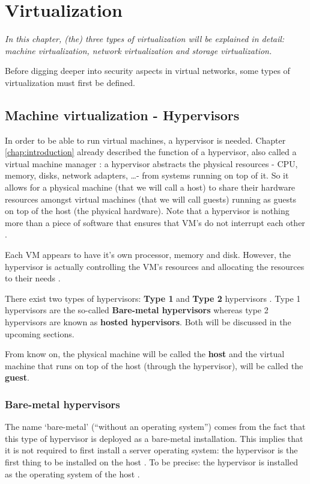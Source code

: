 \chapter{Virtualization}
\label{chap:virtualnetworks}
\emph{In this chapter, (the) three types of virtualization will be explained in detail: machine virtualization, network virtualization and storage virtualization.}

Before digging deeper into security aspects in virtual networks, some types of virtualization must first be defined.
\section{Machine virtualization - Hypervisors}
In order to be able to run virtual machines, a hypervisor is needed. Chapter \ref{chap:introduction} already described the function of a hypervisor, also called a virtual machine manager \citep{Techtarget}: a hypervisor abstracts the physical resources - CPU, memory, disks, network adapters, \ldots - from systems running on top of it. So it allows for a physical machine (that we will call a host) to share their hardware resources amongst virtual machines (that we will call guests) running as guests on top of the host (the physical hardware). Note that a hypervisor is nothing more than a piece of software \citep{Datacenter} that ensures that VM's do not interrupt each other \citep{Techtarget}.

Each VM appears to have it's own processor, memory and disk. However, the hypervisor is actually controlling the VM's resources and allocating the resources to their needs \citep{Techtarget}. 

There exist two types of hypervisors:  \textbf{Type 1} and \textbf{Type 2} hypervisors \citep{Techtarget2}. Type 1 hypervisors are the so-called \textbf{Bare-metal hypervisors} whereas type 2 hypervisors are known as \textbf{hosted hypervisors}. Both will be discussed in the upcoming sections.

From know on, the physical machine will be called the \textbf{host} and the virtual machine that runs on top of the host (through the hypervisor), will be called the \textbf{guest}.

\subsection{Bare-metal hypervisors}
\label{sec:baremetal}
The name `bare-metal' (``without an operating system'') comes from the fact that this type of hypervisor is deployed as a bare-metal installation. This implies that it is not required to first install a server operating system: the hypervisor is the first thing to be installed on the host \citep{Techtarget2}. To be precise: the hypervisor is installed as the operating system of the host \citep{Datacenter}.

